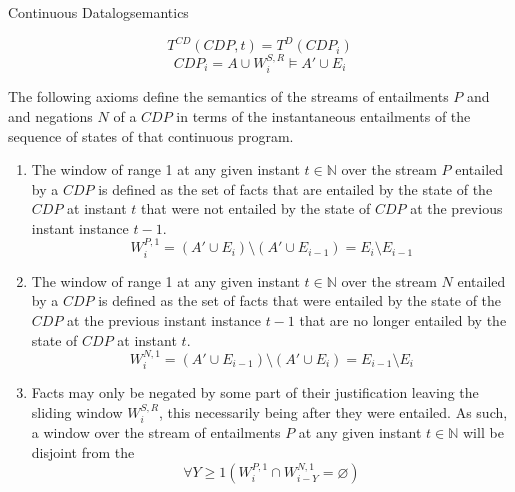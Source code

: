 \begin{nestedsection}{Continuous Datalog}{semantics}
\begin{description}
\begin{equation*}
				T^{CD} \left( CDP, t \right) = T^{D} \left( CDP_{i} \right)
			\end{equation*}
			\begin{equation*}
				CDP_{i} = A \cup W^{S,R}_{i} \vDash A' \cup E_{i}
			\end{equation*}
	\end{description}
	The following axioms define the semantics of the streams of entailments $P$ and and negations $N$ of a ${CDP}$ in terms of the instantaneous entailments of the sequence of states of that continuous program.
	\begin{enumerate}\setcounter{enumi}{\thecontinuousDatalogAxioms}
		\item\label{axiom:continuous datalog: positive window increment}
			The window of range 1 at any given instant ${t \in \mathbb{N}}$ over the stream $P$ entailed by a ${CDP}$ is defined as the set of facts that are entailed by the state of the ${CDP}$ at instant $t$ that were not entailed by the state of ${CDP}$ at the previous instant instance ${t-1}$.
			\begin{equation*}
				W^{P,1}_{i} = \left( A' \cup E_{i} \right) \setminus \left( A' \cup E_{i-1} \right) = E_{i} \setminus E_{i-1}
			\end{equation*}
		\item\label{axiom:continuous datalog: negative window increment}
			The window of range 1 at any given instant ${t \in \mathbb{N}}$ over the stream $N$ entailed by a ${CDP}$ is defined as the set of facts that were entailed by the state of the ${CDP}$ at the previous instant instance ${t-1}$ that are no longer entailed by the state of ${CDP}$ at instant $t$.
			\begin{equation*}
				W^{N,1}_{i} = \left( A' \cup E_{i-1} \right) \setminus \left( A' \cup E_{i} \right) = E_{i-1} \setminus E_{i}
			\end{equation*}
		\item\label{axiom:continuous datalog: entailment precedes negation}
			Facts may only be negated by some part of their justification leaving the sliding window $W^{S,R}_{i}$, this necessarily being after they were entailed.
			As such, a window over the stream of entailments $P$ at any given instant ${t \in \mathbb{N}}$ will be disjoint from the 
			\begin{equation*}
				\forall Y \geq 1 \left( W^{P,1}_{i} \cap W^{N,1}_{i-Y} = \varnothing \right)
			\end{equation*}
		\setcounter{continuousDatalogAxioms}{\theenumi}
	\end{enumerate}


\end{nestedsection}
